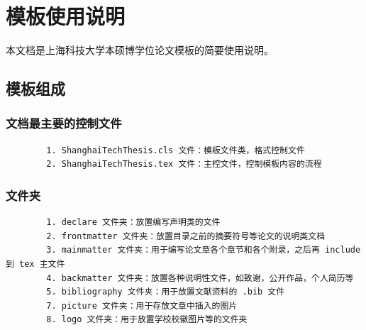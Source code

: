 \chapter{模板使用说明}

{\Large\heiti 本文档是上海科技大学本硕博学位论文模板的简要使用说明。}

\section{模板组成}
\subsection{文档最主要的控制文件}
\begin{verbatim}
        1. ShanghaiTechThesis.cls 文件：模板文件类，格式控制文件
        2. ShanghaiTechThesis.tex 文件：主控文件，控制模板内容的流程
\end{verbatim}

\subsection{文件夹} 
\begin{verbatim}
        1. declare 文件夹：放置编写声明类的文件
        2. frontmatter 文件夹：放置目录之前的摘要符号等论文的说明类文档
        3. mainmatter 文件夹：用于编写论文章各个章节和各个附录，之后再 include 到 tex 主文件
        4. backmatter 文件夹：放置各种说明性文件，如致谢，公开作品，个人简历等
        5. bibliography 文件夹：用于放置文献资料的 .bib 文件
        7. picture 文件夹：用于存放文章中插入的图片
        8. logo 文件夹：用于放置学校校徽图片等的文件夹
\end{verbatim}

